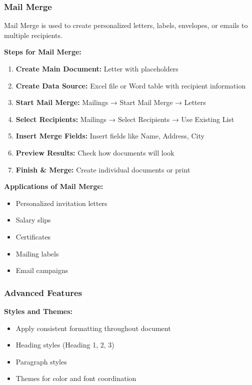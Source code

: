 \documentclass[12pt,a4paper]{article}
\begin{document}
\subsubsection{Mail Merge}

Mail Merge is used to create personalized letters, labels, envelopes, or emails to multiple recipients.

\textbf{Steps for Mail Merge:}
\begin{enumerate}
    \item \textbf{Create Main Document:} Letter with placeholders
    \item \textbf{Create Data Source:} Excel file or Word table with recipient information
    \item \textbf{Start Mail Merge:} Mailings → Start Mail Merge → Letters
    \item \textbf{Select Recipients:} Mailings → Select Recipients → Use Existing List
    \item \textbf{Insert Merge Fields:} Insert fields like Name, Address, City
    \item \textbf{Preview Results:} Check how documents will look
    \item \textbf{Finish \& Merge:} Create individual documents or print
\end{enumerate}

\textbf{Applications of Mail Merge:}
\begin{itemize}
    \item Personalized invitation letters
    \item Salary slips
    \item Certificates
    \item Mailing labels
    \item Email campaigns
\end{itemize}

\subsubsection{Advanced Features}

\textbf{Styles and Themes:}
\begin{itemize}
    \item Apply consistent formatting throughout document
    \item Heading styles (Heading 1, 2, 3)
    \item Paragraph styles
    \item Themes for color and font coordination
\end{itemize}
\end{document}

